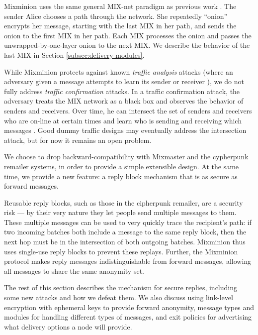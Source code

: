 \documentclass{llncs}
\begin{document}
Mixminion uses the same general MIX-net paradigm as previous work
\cite{chaum-mix,mixmaster-attacks,others}. The sender Alice chooses a
path through the network. She repeatedly ``onion'' encrypts her message,
starting with the last
MIX in her path, and sends the onion to the first MIX in her path. Each
MIX processes the onion and passes the unwrapped-by-one-layer onion to
the next MIX. We describe the behavior of the last MIX in
Section \ref{subsec:delivery-modules}.

While Mixminion protects against known \emph{traffic analysis} attacks
(where an adversary given a message attempts to learn its sender or
receiver \cite{rackoff93cryptographic,raymond00}), we do not fully address \emph{traffic
confirmation} attacks. In a traffic confirmation attack, the adversary
treats the MIX network as a black box and observes the behavior of
senders and receivers. Over time, he can intersect the set of senders
and receivers who are on-line at certain times and learn who is sending
and receiving which messages \cite{langos02}. Good dummy traffic designs
may eventually address the intersection attack, but for now it remains
an open problem.

We choose to drop backward-compatibility with Mixmaster and the cypherpunk
remailer systems, in order to provide a simple extensible design. At
the same time, we provide a new feature: a reply block mechanism that
is as secure as forward messages.

Reusable reply blocks, such as those in the cipherpunk remailer, are a
security risk --- by their very nature they let people send multiple
messages to them. These multiple messages can be used to very quickly
trace the recipient's path: if two incoming batches both include a
message to the same reply block, then the next hop must be in the
intersection of both outgoing batches. Mixminion thus uses single-use
reply blocks to prevent these replays. Further, the Mixminion protocol
makes reply messages indistinguishable from forward messages, allowing
all messages to share the same anonymity set.

The rest of this section describes the mechanism for secure replies,
including some new attacks and how we defeat them. We also discuss using
link-level encryption with ephemeral keys to provide forward anonymity,
message types and modules for handling different types of messages, and
exit policies for advertising what delivery options a node will provide.

\end{document}

